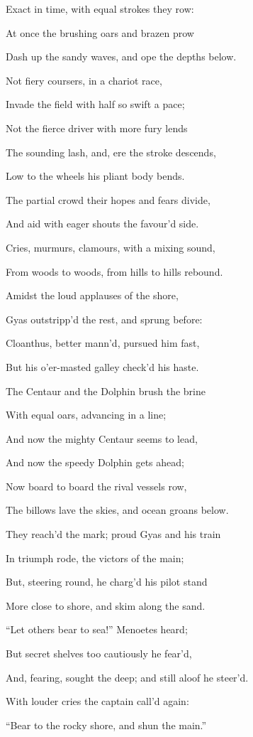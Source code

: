 Exact in time, with equal strokes they row:

At once the brushing oars and brazen prow

Dash up the sandy waves, and ope the depths below.

Not fiery coursers, in a chariot race,

Invade the field with half so swift a pace;

Not the fierce driver with more fury lends

The sounding lash, and, ere the stroke descends,

Low to the wheels his pliant body bends.

The partial crowd their hopes and fears divide,

And aid with eager shouts the favour’d side.

Cries, murmurs, clamours, with a mixing sound,

From woods to woods, from hills to hills rebound.

Amidst the loud applauses of the shore,

Gyas outstripp’d the rest, and sprung before:

Cloanthus, better mann’d, pursued him fast,

But his o’er-masted galley check’d his haste.

The Centaur and the Dolphin brush the brine

With equal oars, advancing in a line;

And now the mighty Centaur seems to lead,

And now the speedy Dolphin gets ahead;

Now board to board the rival vessels row,

The billows lave the skies, and ocean groans below.

They reach’d the mark; proud Gyas and his train

In triumph rode, the victors of the main;

But, steering round, he charg’d his pilot stand

More close to shore, and skim along the sand.

“Let others bear to sea!” Menoetes heard;

But secret shelves too cautiously he fear’d,

And, fearing, sought the deep; and still aloof he steer’d.

With louder cries the captain call’d again:

“Bear to the rocky shore, and shun the main.”

